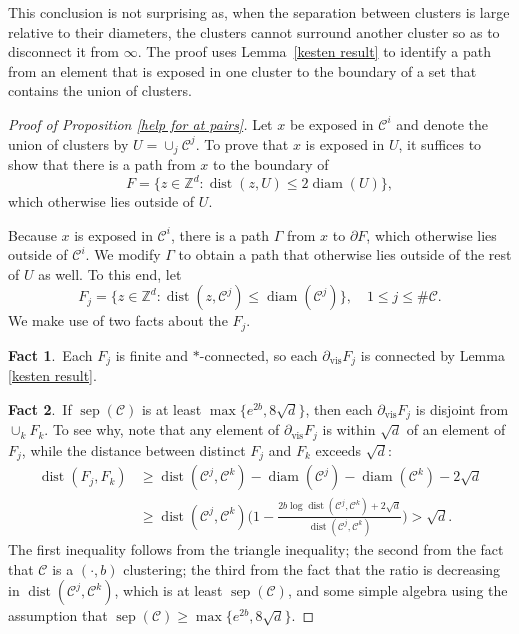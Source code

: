 \documentclass[11pt,reqno]{amsart}
\theoremstyle{definition}
\numberwithin{equation}{section}
\newcommand{\Z}{\mathbb{Z}}
\newcommand{\1}{\mathbf{1}}
\newcommand{\bdy}{\partial}
\DeclareMathOperator{\dist}{dist}
\DeclareMathOperator{\diam}{diam}
\newcommand{\bdyvis}{\partial_{\mathrm{vis}}}
\DeclareMathOperator{\sep}{sep}
\newcommand{\CC}{\mathcal{C}}
\begin{document}
This conclusion is not surprising as, when the separation between clusters is large relative to their diameters, the clusters cannot surround another cluster so as to disconnect it from $\infty$. The proof uses Lemma~\ref{kesten result} to identify a path from an element that is exposed in one cluster to the boundary of a set that contains the union of clusters.

\begin{proof}[Proof of Proposition \ref{help for at pairs}]
Let $x$ be exposed in $\CC^i$ and denote the union of clusters by $U = \cup_j \CC^j$. To prove that $x$ is exposed in $U$, it suffices to show that there is a path from $x$ to the boundary of 
\[
F = \{ z \in \Z^d: \dist (z, U ) \leq 2 \diam ( U ) \},
\]
which otherwise lies outside of $U$. 

Because $x$ is exposed in $\CC^i$, there is a path $\Gamma$ from $x$ to $\bdy F$, which otherwise lies outside of $\CC^i$. We modify $\Gamma$ to obtain a path that otherwise lies outside of the rest of $U$ as well. To this end, let 
\[ 
F_j = \big\{ z \in \Z^d: \dist (z,\CC^j) \leq \diam (\CC^j) \big\}, \quad 1 \leq j \leq \# \CC.
\]
We make use of two facts about the $F_j$.

{\bf Fact 1}.\ Each $F_j$ is finite and $\ast$-connected, so each $\bdyvis F_j$ is connected by Lemma \ref{kesten result}.

{\bf Fact 2}.\ If $\sep (\CC)$ is at least $\max\{e^{2b},8\sqrt{d}\}$, then each $\bdyvis F_j$ is disjoint from $\cup_k F_k$. To see why, note that any element of $\bdyvis F_j$ is within $\sqrt{d}$ of an element of $F_j$, while the distance between distinct $F_j$ and $F_k$ exceeds $\sqrt{d}$:
\begin{align*}
\dist (F_j,F_k) & \geq \dist(\CC^j,\CC^k) - \diam (\CC^j) - \diam (\CC^k)  - 2\sqrt{d}\\ 
& \geq \dist (\CC^j,\CC^k) \Big( 1 - \frac{2b \log \dist (\CC^j,\CC^k) + 2\sqrt{d}}{\dist (\CC^j,\CC^k)} \Big) > \sqrt{d}. 
\end{align*}
The first inequality follows from the triangle inequality; the second from the fact that $\CC$ is a $(\cdot,b)$ clustering; the third from the fact that the ratio is decreasing in $\dist (\CC^j, \CC^k)$, which is at least $\sep (\CC)$, and some simple algebra using the assumption that $\sep (\CC) \geq \max\{e^{2b},8\sqrt{d}\}$.


\end{proof}
\end{document}
